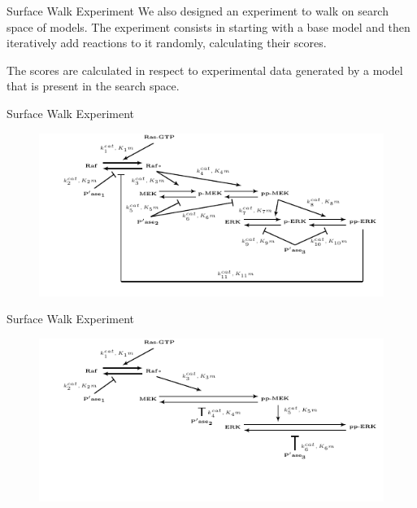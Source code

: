 \documentclass{beamer}
\begin{document}
\begin{frame}{Surface Walk Experiment}
We also designed an experiment to walk on search space of models. The
experiment consists in starting with a base model and then iteratively 
add reactions to it randomly, calculating their scores. 

\pause
The scores are calculated in respect to experimental data generated by
a model that is present in the search space.
\end{frame}


\begin{frame}{Surface Walk Experiment}
\begin{figure}
    \includegraphics[scale=1.2]{experiments/surface_walk/correct_model.pdf}
\end{figure}
\end{frame}

\begin{frame}{Surface Walk Experiment}
\begin{figure}
    \includegraphics[scale=1.2]{experiments/surface_walk/base_model.pdf}
\end{figure}
\end{frame}
\end{document}
